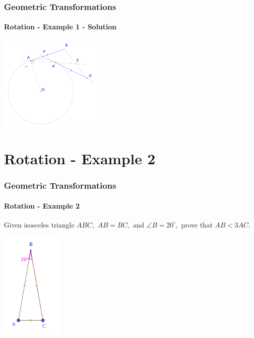 \documentclass[8pt,xcolor=table,dvipsnames]{beamer}
\newcommand{\dg}{^\circ}
\begin{document}
\begin{frame}[t]
    \frametitle{Geometric Transformations}
    \framesubtitle{Rotation - Example 1 - Solution}
    \begin{center}
        \includegraphics[width=5cm]{./svg/pdf/sc-23-hs-3-p7-2.pdf}
    \end{center}
\end{frame}

\section{Rotation - Example 2}

\begin{frame}[t]
    \frametitle{Geometric Transformations}
    \framesubtitle{Rotation - Example 2}
    \begin{example}
        Given isosceles triangle $ABC,$ $AB = BC,$ and $\angle B = 20\dg,$ prove that $AB < 3AC.$
    \end{example}

    \bigbreak
    \begin{center}
        \includegraphics[width=3cm]{./svg/pdf/24-25-t4-p8-0.pdf}
    \end{center}
\end{frame}
\end{document}
